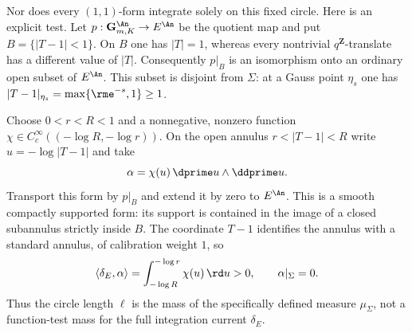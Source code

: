 \begin{example}
Nor does every $(1,1)$-form integrate solely on this fixed circle.
Here is an explicit test.  Let
$p:\mathbf G_{m,K}^{\An}\to E^{\An}$ be the quotient map and put
$B=\{|T-1|<1\}$.  On $B$ one has $|T|=1$, whereas every nontrivial
$q^{\mathbf Z}$-translate has a different value of $|T|$.
Consequently $p|_B$ is an isomorphism onto an ordinary open subset of
$E^{\An}$.  This subset is disjoint from $\Sigma$: at a Gauss point
$\eta_s$ one has $|T-1|_{\eta_s}=\max\{\rme^{-s},1\}\geq1$.

Choose $0<r<R<1$ and a nonnegative, nonzero function
$\chi\in C_c^\infty((-\log R,-\log r))$.
On the open annulus $r<|T-1|<R$ write $u=-\log|T-1|$ and take
\[
                           \alpha=\chi(u)\,\dprime u\wedge\ddprime u.
\]
Transport this form by $p|_B$ and extend it by zero to $E^{\An}$.
This is a smooth compactly supported form: its support is contained
in the image of a closed subannulus strictly inside $B$.
The coordinate $T-1$ identifies the annulus with a standard annulus,
of calibration weight $1$, so
\[
 \langle\delta_E,\alpha\rangle
       =\int_{-\log R}^{-\log r}\chi(u)\,\rd u>0,
                  \qquad \alpha|_\Sigma=0.
\]
Thus the circle length $\ell$ is the mass of the specifically defined
measure $\mu_\Sigma$, not a function-test mass for the full
integration current $\delta_E$.
\end{example}
